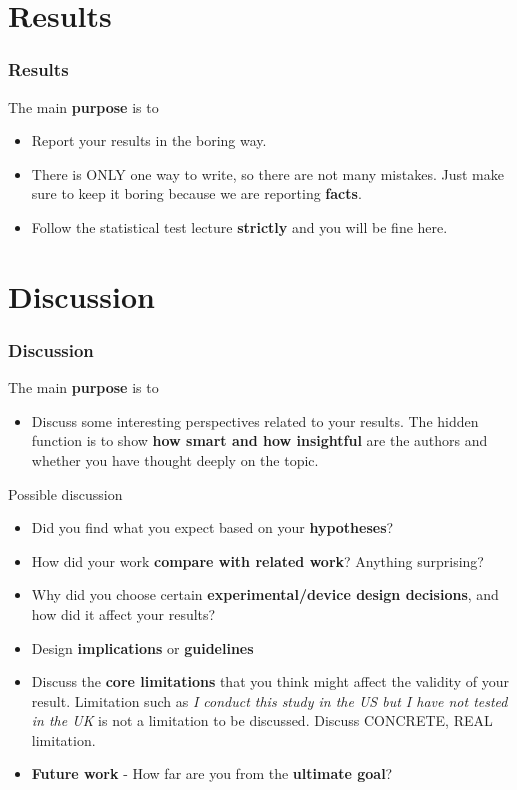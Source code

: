\documentclass{beamer}
\begin{document}
\section{Results}

\begin{frame}
\frametitle{Results} 
 The main \textbf{purpose} is to
\begin{itemize}
	\item Report your results in the boring way.
	\item There is ONLY one way to write, so there are not many mistakes.   Just make sure to keep it boring because we are reporting \textbf{facts}.
	\item Follow the statistical test lecture \textbf{strictly} and you will be fine here.
\end{itemize}
\end{frame}

\section{Discussion}

\begin{frame}
\footnotesize
\frametitle{Discussion} 
 The main \textbf{purpose} is to
\begin{itemize}
	\item Discuss some interesting perspectives related to your results.   The hidden function is to show \textbf{how smart and how insightful} are the authors and whether you have thought deeply on the topic.
\end{itemize}
Possible discussion
\begin{itemize}
	\item Did you find what you expect based on your \textbf{hypotheses}?
	\item How did your work \textbf{compare with related work}? Anything surprising?
	\item Why did you choose certain \textbf{experimental/device design decisions}, and how did it affect your results?
	\item Design \textbf{implications} or \textbf{guidelines}
	\item Discuss the \textbf{core limitations} that you think might affect the validity of your result. Limitation such as \textit{I conduct this study in the US but I have not tested in the UK} is not a limitation to be discussed.  Discuss CONCRETE, REAL limitation.
	\item \textbf{Future work} - How far are you from the \textbf{ultimate goal}?
\end{itemize}

\end{frame}
\end{document}
